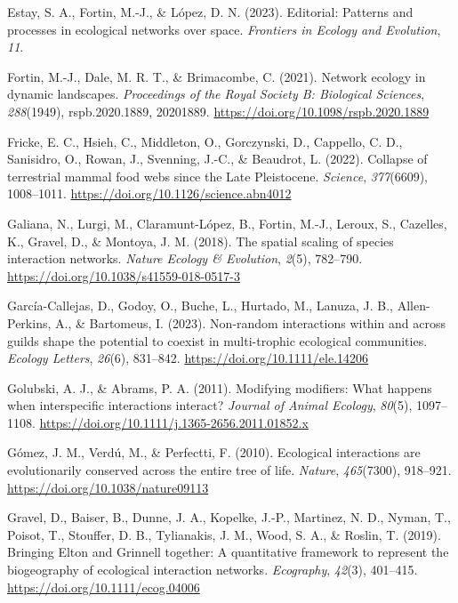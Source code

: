 \documentclass[
]{article}
\newlength{\cslhangindent}
\newenvironment{CSLReferences}[2] %
 {\begin{list}{}{%
  \setlength{\itemindent}{0pt}
  \setlength{\leftmargin}{0pt}
  \setlength{\parsep}{0pt}
  \ifodd #1
   \setlength{\leftmargin}{\cslhangindent}
   \setlength{\itemindent}{-1\cslhangindent}
  \fi
  \setlength{\itemsep}{#2\baselineskip}}}
 {\end{list}}
\begin{document}
\begin{CSLReferences}{1}{0}
Estay, S. A., Fortin, M.-J., \& López, D. N. (2023). Editorial:
{Patterns} and processes in ecological networks over space.
\emph{Frontiers in Ecology and Evolution}, \emph{11}.

Fortin, M.-J., Dale, M. R. T., \& Brimacombe, C. (2021). Network ecology
in dynamic landscapes. \emph{Proceedings of the Royal Society B:
Biological Sciences}, \emph{288}(1949), rspb.2020.1889, 20201889.
\url{https://doi.org/10.1098/rspb.2020.1889}

Fricke, E. C., Hsieh, C., Middleton, O., Gorczynski, D., Cappello, C.
D., Sanisidro, O., Rowan, J., Svenning, J.-C., \& Beaudrot, L. (2022).
Collapse of terrestrial mammal food webs since the {Late Pleistocene}.
\emph{Science}, \emph{377}(6609), 1008--1011.
\url{https://doi.org/10.1126/science.abn4012}

Galiana, N., Lurgi, M., Claramunt-López, B., Fortin, M.-J., Leroux, S.,
Cazelles, K., Gravel, D., \& Montoya, J. M. (2018). The spatial scaling
of species interaction networks. \emph{Nature Ecology \& Evolution},
\emph{2}(5), 782--790. \url{https://doi.org/10.1038/s41559-018-0517-3}

García-Callejas, D., Godoy, O., Buche, L., Hurtado, M., Lanuza, J. B.,
Allen-Perkins, A., \& Bartomeus, I. (2023). Non-random interactions
within and across guilds shape the potential to coexist in multi-trophic
ecological communities. \emph{Ecology Letters}, \emph{26}(6), 831--842.
\url{https://doi.org/10.1111/ele.14206}

Golubski, A. J., \& Abrams, P. A. (2011). Modifying modifiers: What
happens when interspecific interactions interact? \emph{Journal of
Animal Ecology}, \emph{80}(5), 1097--1108.
\url{https://doi.org/10.1111/j.1365-2656.2011.01852.x}

Gómez, J. M., Verdú, M., \& Perfectti, F. (2010). Ecological
interactions are evolutionarily conserved across the entire tree of
life. \emph{Nature}, \emph{465}(7300), 918--921.
\url{https://doi.org/10.1038/nature09113}

Gravel, D., Baiser, B., Dunne, J. A., Kopelke, J.-P., Martinez, N. D.,
Nyman, T., Poisot, T., Stouffer, D. B., Tylianakis, J. M., Wood, S. A.,
\& Roslin, T. (2019). Bringing {Elton} and {Grinnell} together: A
quantitative framework to represent the biogeography of ecological
interaction networks. \emph{Ecography}, \emph{42}(3), 401--415.
\url{https://doi.org/10.1111/ecog.04006}


\end{CSLReferences}
\end{document}
